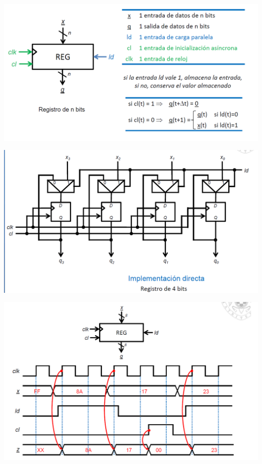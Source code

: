 \documentclass[a4paper,10pt]{book}
\begin{document}
\begin{center}
\includegraphics[scale=0.42]{registro}
\end{center}

\begin{center}
\includegraphics[scale=0.42]{implementacion registro}
\end{center}

\begin{center}
\includegraphics[scale=0.47]{cronograma registro}
\end{center}
\end{document}
